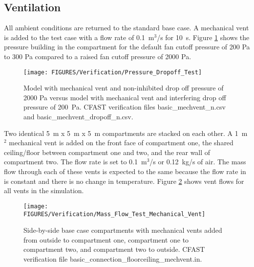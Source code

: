 \subsection{Ventilation}

All ambient conditions are returned to the standard base case.  A mechanical vent is added to the test case with a flow rate of 0.1~m$^3$/s for 10~s. Figure \ref{fig:Mechanical_Vent_Cutoff} shows the pressure building in the compartment for the default fan cutoff pressure of 200 Pa to 300 Pa compared to a raised fan cutoff pressure of 2000 Pa.

\begin{figure}
\begin{center}
\texttt{[image: FIGURES/Verification/Pressure\_Dropoff\_Test]}
\caption{Model with mechanical vent and non-inhibited drop off pressure of 2000 Pa versus model with mechanical vent and interfering drop off pressure of 200~Pa. CFAST verification files basic\_mechvent\_n.csv and basic\_mechvent\_dropoff\_n.csv.}
\label{fig:Mechanical_Vent_Cutoff}
\end{center}
\end{figure}

Two identical 5~m x 5~m x 5~m compartments are stacked on each other.  A 1~m$^2$ mechanical vent is added on the front face of compartment one, the shared ceiling/floor between compartment one and two, and the rear wall of compartment two.  The flow rate is set to 0.1~m$^3$/s or 0.12~kg/s of air.  The mass flow through each of these vents is expected to the same because the flow rate in is constant and there is no change in temperature.   Figure \ref{fig:Mechanical_Flow_Two_Compartments} shows vent flows for all vents in the simulation.

\begin{figure}
\begin{center}
\texttt{[image: FIGURES/Verification/Mass\_Flow\_Test\_Mechanical\_Vent]}
\caption{Side-by-side base case compartments with mechanical vents added from outside to compartment one, compartment one to compartment two, and compartment two to outside.  CFAST verification file basic\_connection\_floorceiling\_mechvent.in.}
\label{fig:Mechanical_Flow_Two_Compartments}
\end{center}
\end{figure}





